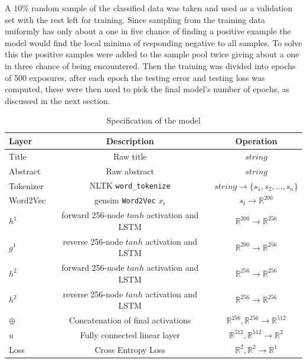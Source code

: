 \documentclass[12pt, a4paper]{article}
\begin{document}
A $10\%$ random sample of the classified data was taken and used as a validation set with the rest left for training. Since sampling from the training data uniformly has only about a one in five chance of finding a positive example the model would find the local minima of responding negative to all samples. To solve this the positive samples were added to the sample pool twice giving about a one in three chance of being encountered. Then the training was divided into epochs of 500 exposures, after each epoch the testing error and testing loss was computed, these were then used to pick the final model's number of epochs, as discussed in the next section. 

\begin{table}[H]
	\centering
	\begin{adjustbox}{center}
	\begin{tabular}{|l|c|c|}
		\toprule
		Layer & Description&Operation\\
		\midrule
		Title & Raw title & $string$\\
		Abstract & Raw abstract & $string$\\
		Tokenizer & NLTK \texttt{word\_tokenize} & $string \rightarrow \{s_1 , s_2, \dots, s_n\}$\\
		Word2Vec & gensim \texttt{Word2Vec} $x_t$ & $s_t \rightarrow \mathbb{R}^{200}$ \\
		$h^1$ & forward 256-node $tanh$ activation and LSTM&$\mathbb{R}^{200} \rightarrow \mathbb{R}^{256}$\\
		$g^1$ & reverse 256-node $tanh$ activation and LSTM&$\mathbb{R}^{200} \rightarrow \mathbb{R}^{256}$\\
		$h^2$ & forward 256-node $tanh$ activation and LSTM&$\mathbb{R}^{256} \rightarrow \mathbb{R}^{256}$\\
		$h^2$ & reverse 256-node $tanh$ activation and LSTM&$\mathbb{R}^{256} \rightarrow \mathbb{R}^{256}$\\
		$\oplus$ & Concatenation of final activations &$\mathbb{R}^{256} , \mathbb{R}^{256} \rightarrow \mathbb{R}^{512}$\\
		$u$ & Fully connected linear layer  & $\mathbb{R}^{512}, \mathbb{R}^{512} \rightarrow \mathbb{R}^{2}$\\
		Loss & Cross Entropy Loss & $\mathbb{R}^{2}, \mathbb{R}^{2} \rightarrow \mathbb{R}^{1}$\\
		\bottomrule
	\end{tabular}
\end{adjustbox}
\caption{Specification of the model}\label{lt}
\end{table}
\end{document}
